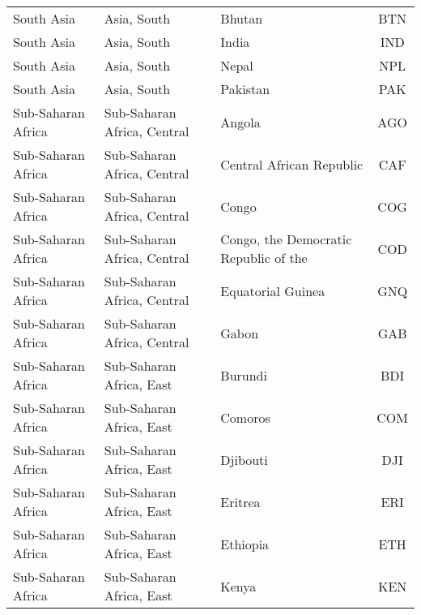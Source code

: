 \begin{longtable}{|p{3cm}|p{3.5cm}|p{5cm}|c|}
                    South Asia &                  Asia, South &                                            Bhutan &  BTN \\
                    South Asia &                  Asia, South &                                             India &  IND \\
                    South Asia &                  Asia, South &                                             Nepal &  NPL \\
                    South Asia &                  Asia, South &                                          Pakistan &  PAK \\
            Sub-Saharan Africa &  Sub-Saharan Africa, Central &                                            Angola &  AGO \\
            Sub-Saharan Africa &  Sub-Saharan Africa, Central &                          Central African Republic &  CAF \\
            Sub-Saharan Africa &  Sub-Saharan Africa, Central &                                             Congo &  COG \\
            Sub-Saharan Africa &  Sub-Saharan Africa, Central &             Congo, the Democratic Republic of the &  COD \\
            Sub-Saharan Africa &  Sub-Saharan Africa, Central &                                 Equatorial Guinea &  GNQ \\
            Sub-Saharan Africa &  Sub-Saharan Africa, Central &                                             Gabon &  GAB \\
            Sub-Saharan Africa &     Sub-Saharan Africa, East &                                           Burundi &  BDI \\
            Sub-Saharan Africa &     Sub-Saharan Africa, East &                                           Comoros &  COM \\
            Sub-Saharan Africa &     Sub-Saharan Africa, East &                                          Djibouti &  DJI \\
            Sub-Saharan Africa &     Sub-Saharan Africa, East &                                           Eritrea &  ERI \\
            Sub-Saharan Africa &     Sub-Saharan Africa, East &                                          Ethiopia &  ETH \\
            Sub-Saharan Africa &     Sub-Saharan Africa, East &                                             Kenya &  KEN \\

\end{longtable}
